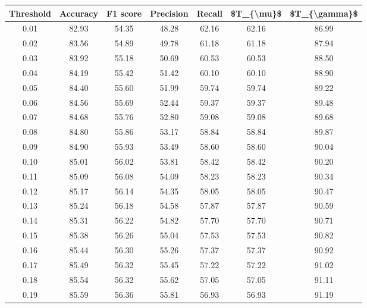 \begin{tabular}{|c|c|c|c|c|c|c|}
\hline
 Threshold &  Accuracy &  F1 score &  Precision &  Recall &  \$T\_\{\textbackslash mu\}\$ &  \$T\_\{\textbackslash gamma\}\$ \\
\hline
      0.01 &     82.93 &     54.35 &      48.28 &   62.16 &      62.16 &         86.99 \\
      0.02 &     83.56 &     54.89 &      49.78 &   61.18 &      61.18 &         87.94 \\
      0.03 &     83.92 &     55.18 &      50.69 &   60.53 &      60.53 &         88.50 \\
      0.04 &     84.19 &     55.42 &      51.42 &   60.10 &      60.10 &         88.90 \\
      0.05 &     84.40 &     55.60 &      51.99 &   59.74 &      59.74 &         89.22 \\
      0.06 &     84.56 &     55.69 &      52.44 &   59.37 &      59.37 &         89.48 \\
      0.07 &     84.68 &     55.76 &      52.80 &   59.08 &      59.08 &         89.68 \\
      0.08 &     84.80 &     55.86 &      53.17 &   58.84 &      58.84 &         89.87 \\
      0.09 &     84.90 &     55.93 &      53.49 &   58.60 &      58.60 &         90.04 \\
      0.10 &     85.01 &     56.02 &      53.81 &   58.42 &      58.42 &         90.20 \\
      0.11 &     85.09 &     56.08 &      54.09 &   58.23 &      58.23 &         90.34 \\
      0.12 &     85.17 &     56.14 &      54.35 &   58.05 &      58.05 &         90.47 \\
      0.13 &     85.24 &     56.18 &      54.58 &   57.87 &      57.87 &         90.59 \\
      0.14 &     85.31 &     56.22 &      54.82 &   57.70 &      57.70 &         90.71 \\
      0.15 &     85.38 &     56.26 &      55.04 &   57.53 &      57.53 &         90.82 \\
      0.16 &     85.44 &     56.30 &      55.26 &   57.37 &      57.37 &         90.92 \\
      0.17 &     85.49 &     56.32 &      55.45 &   57.22 &      57.22 &         91.02 \\
      0.18 &     85.54 &     56.32 &      55.62 &   57.05 &      57.05 &         91.11 \\
      0.19 &     85.59 &     56.36 &      55.81 &   56.93 &      56.93 &         91.19 \\

\end{tabular}
